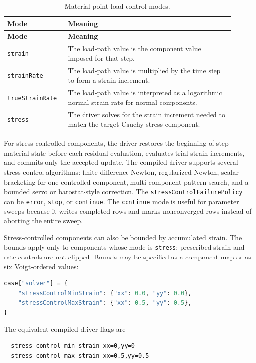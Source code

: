 \begin{longtable}{@{}p{0.23\linewidth}p{0.68\linewidth}@{}}
\caption{Material-point load-control modes.\label{tab:material-point-control-modes}}\\
\toprule
\textbf{Mode} & \textbf{Meaning}\\
\midrule
\endfirsthead
\toprule
\textbf{Mode} & \textbf{Meaning}\\
\midrule
\endhead
\texttt{strain} & The load-path value is the component value imposed for that step.\\
\texttt{strainRate} & The load-path value is multiplied by the time step to form a strain increment.\\
\texttt{trueStrainRate} & The load-path value is interpreted as a logarithmic normal strain rate for normal components.\\
\texttt{stress} & The driver solves for the strain increment needed to match the target Cauchy stress component.\\
\bottomrule
\end{longtable}

For stress-controlled components, the driver restores the beginning-of-step material state before each residual evaluation, evaluates trial strain increments, and commits only the accepted update.  The compiled driver supports several stress-control algorithms: finite-difference Newton, regularized Newton, scalar bracketing for one controlled component, multi-component pattern search, and a bounded servo or barostat-style correction.  The \texttt{stressControlFailurePolicy} can be \texttt{error}, \texttt{stop}, or \texttt{continue}.  The \texttt{continue} mode is useful for parameter sweeps because it writes completed rows and marks nonconverged rows instead of aborting the entire sweep.

Stress-controlled components can also be bounded by accumulated strain.  The bounds apply only to components whose mode is \texttt{stress}; prescribed strain and rate controls are not clipped.  Bounds may be specified as a component map or as six Voigt-ordered values:
\begin{lstlisting}[language=Python,caption={Stress-control strain bounds in a Python case.},label={lst:material-point-strain-bounds},basicstyle=\ttfamily\small]
case["solver"] = {
    "stressControlMinStrain": {"xx": 0.0, "yy": 0.0},
    "stressControlMaxStrain": {"xx": 0.5, "yy": 0.5},
}
\end{lstlisting}
The equivalent compiled-driver flags are
\begin{lstlisting}[language=bash,basicstyle=\ttfamily\small]
--stress-control-min-strain xx=0,yy=0
--stress-control-max-strain xx=0.5,yy=0.5
\end{lstlisting}

